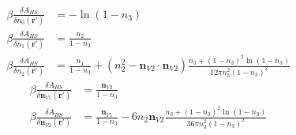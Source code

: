 \documentclass[letterpaper,twocolumn,amsmath,amssymb,prb]{revtex4-1}
\begin{document}
\begin{align}
    \beta\frac{\delta A_{HS}}{\delta n_0(\mathbf{r}')} &= -\ln(1-n_3)
    \\
    \beta\frac{\delta A_{HS}}{\delta n_1(\mathbf{r}')} &= \frac{n_2}{1-n_3}
    \\
    \beta\frac{\delta A_{HS}}{\delta n_2(\mathbf{r}')} &=
      \frac{n_1}{1-n_3}
      + (n_2^2 - \mathbf{n}_{V2}\cdot\mathbf{n}_{V2})\frac{n_3 +
        (1-n_3)^2\ln(1-n_3)}{
        12\pi n_3^2(1-n_3)^2
      }
\end{align}
\begin{align}
    \beta\frac{\delta A_{HS}}{\delta \mathbf{n}_{V1}(\mathbf{r}')} &=
      \frac{\mathbf{n}_{V2}}{1-n_3}
    \\
    \beta\frac{\delta A_{HS}}{\delta \mathbf{n}_{V2}(\mathbf{r}')} &=
      \frac{\mathbf{n}_{V1}}{1-n_3}
      - 6 n_2 \mathbf{n}_{V2} \frac{n_3 +
        (1-n_3)^2\ln(1-n_3)}{
        36\pi n_3^2(1-n_3)^2
      }
  \end{align}

\end{document}
